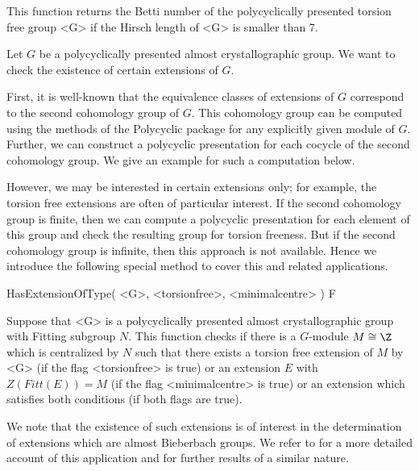 This function returns the Betti number of the polycyclically presented
torsion free group <G> if the Hirsch length of <G> is smaller than 7.


Let $G$ be a polycyclically presented almost crystallographic group. We want 
to check the existence of certain extensions of $G$. 

First, it is well-known that the equivalence classes of extensions of $G$
correspond to the second cohomology group of $G$. This cohomology group can
be computed using the methods of the {\sf Polycyclic} package for any 
explicitly given module of $G$. Further, we can construct a polycyclic
presentation for each cocycle of the second cohomology group. We give an 
example for such a computation below. 

However, we may be interested in certain extensions only; for example, 
the torsion free extensions are often of particular interest. If the 
second cohomology group is finite, then we can compute a polycyclic 
presentation for each element of this group and check the resulting group
for torsion freeness. But if the second cohomology group is infinite, then
this approach is not available. Hence we introduce the following special 
method to cover this and related applications.

\> HasExtensionOfType( <G>, <torsionfree>, <minimalcentre> ) F

Suppose that <G> is a polycyclically presented almost crystallographic group
with Fitting subgroup $N$. This function checks if there is a $G$-module 
$M \cong \Z$ which is centralized by $N$ such that there exists a torsion
free extension of $M$ by <G> (if the flag <torsionfree> is true) or an 
extension $E$ with $Z(Fitt(E)) = M$ (if the flag <minimalcentre> is true)
or an extension which satisfies both conditions (if both flags are true).

We note that the existence of such extensions is of interest in the 
determination of extensions which are almost Bieberbach groups. We refer 
to \cite{DE1} for a more detailed account of this application and for
further results of a similar nature.

